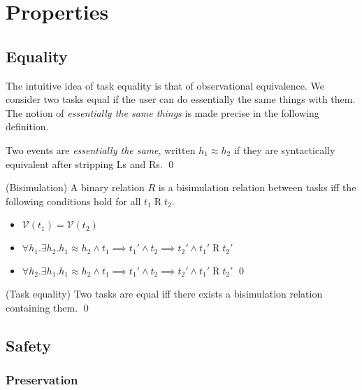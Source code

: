 
\section{Properties}

\subsection{Equality}

The intuitive idea of task equality is that of observational equivalence.
We consider two tasks equal if the user can do essentially the same things with them.
The notion of \emph{essentially the same things} is made precise in the following definition.

\begin{definition}
Two events are \emph{essentially the same}, written $h_1 \approx h_2$ if they are syntactically equivalent after stripping Ls and Rs. \qed
\end{definition}

\begin{definition}
(Bisimulation) A binary relation $R$ is a bisimulation relation between tasks iff the following conditions hold for all $t_1 \mathrel{R} t_2$.
\begin{itemize}
\item $\mathcal{V}(t_1) = \mathcal{V}(t_2)$
\item $\forall h_1 . \exists h_2 . h_1 \approx h_2 \wedge t_1 \implies t_1' \wedge t_2 \implies t_2' \wedge t_1' \mathrel{R} t_2'$
\item $\forall h_2 . \exists h_1 . h_1 \approx h_2 \wedge t_1 \implies t_1' \wedge t_2 \implies t_2' \wedge t_1' \mathrel{R} t_2'$ \qed
\end{itemize}
\end{definition}

\begin{definition}
(Task equality) Two tasks are equal iff there exists a bisimulation relation containing them. \qed
\end{definition}

\subsection{Safety}
\subsubsection{Preservation}


